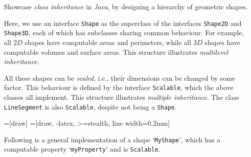  

\problem Showcase \textit{class inheritance} in \textit{Java}, by designing a hierarchy of geometric shapes.

\solution Here, we use an interface \texttt{Shape} as the superclass of the interfaces \texttt{Shape2D} and \texttt{Shape3D}, 
each of which has subclasses sharing common behaviour. For example, all $2D$ shapes have computable areas and perimeters, while
all $3D$ shapes have computable volumes and surface areas. This structure illustrates \textit{multilevel inheritance}.

All these shapes can be \textit{scaled}, i.e., their dimensions can be changed by some factor. This behaviour is defined by 
the interface \texttt{Scalable}, which the above classes all implement. This structure illustrates \textit{multiple inheritance}.
The class \texttt{LineSegment} is also \texttt{Scalable}, despite not being a \texttt{Shape}.

\vspace{10mm}

=[draw]
=[draw, -latex, >=stealth, line width=0.2mm]

\begin{figure}[htpb]
\begin{center}
\end{center}
\label{fig:shape_tree}
\end{figure}

\vspace{10mm}

Following is a general implementation of a shape `\texttt{MyShape}', which has a computable property `\texttt{myProperty}' and
is \texttt{Scalable}.

